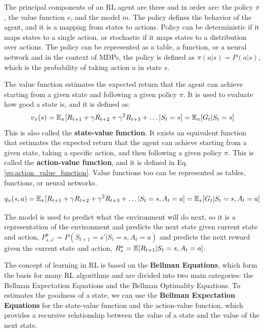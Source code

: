 The principal components of an RL agent are three and in order are: the policy $\pi$, the value function $v$, and the model $m$.
The policy defines the behavior of the agent, and it is a mapping from states to actions.
Policy can be deterministic if it maps states to a single action, or stochastic if it maps states to a distribution over actions.
The policy can be represented as a table, a function, or a neural network and in the context of MDPs, the policy is defined as $\pi(a|s) = P(a|s)$, which is the probability of taking action $a$ in state $s$.


The value function estimates the expected return that the agent can achieve starting from a given state and following a given policy $\pi$.
It is used to evaluate how good a state is, and it is defined as:
\begin{equation} \label{eq:value_function}
    v_{\pi}(s) = \operatorname{\mathbb{E}}_{\pi}[R_{t+1} + \gamma R_{t+2} + \gamma^2 R_{t+3} + \dots | S_t = s] = \operatorname{\mathbb{E}}_{\pi}[G_t | S_t = s]
\end{equation}
This is also called the \textbf{state-value function}.
It exists an equivalent function that estimates the expected return that the agent can achieve starting from a given state, taking a specific action, and then following a given policy $\pi$.
This is called the \textbf{action-value function}, and it is defined in Eq. \ref{eq:action_value_function}.
Value functions too can be represented as tables, functions, or neural networks.

\begin{equation} \label{eq:action_value_function}
    q_{\pi}(s, a) = \operatorname{\mathbb{E}}_{\pi}[R_{t+1} + \gamma R_{t+2} + \gamma^2 R_{t+3} + \dots | S_t = s, A_t = a] = \operatorname{\mathbb{E}}_{\pi}[G_t | S_t = s, A_t = a]
\end{equation}


The model is used to predict what the environment will do next, so it is a representation of the environment and predicts the next state given current state and action, $P_{s, s'}^a = P(S_{t+1} = s' | S_t = s, A_t = a)$ and predicts the next reward given the current state and action, $R_s^a = \operatorname{\mathbb{E}}[R_{t+1} | S_t = s, A_t = a]$.

The concept of learning in RL is based on the \textbf{Bellman Equations}, which form the basis for many RL algorithms and are divided into two main categories: the Bellman Expectation Equations and the Bellman Optimality Equations.
To estimates the goodness of a state, we can use the \textbf{Bellman Expectation Equations} for the state-value function and the action-value function, which provides a recursive relationship between the value of a state and the value of the next state.

